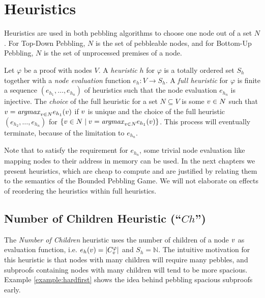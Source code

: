 \section{Heuristics}
\label{sec:heuristics}

Heuristics are used in both pebbling algorithms to choose one node out of a set $N$. 
For Top-Down Pebbling, $N$ is the set of pebbleable nodes, and for Bottom-Up Pebbling, $N$ is the set of unprocessed premises of a node. 

\begin{definition}

Let $\varphi$ be a proof with nodes $V$.
A \emph{heuristic} $h$ for $\varphi$ is a totally ordered set $S_h$ together with a \emph{node evaluation} function $e_h: V \rightarrow S_h$.
A \emph{full heuristic} for $\varphi$ is finite a sequence $(e_{h_1}, \ldots, e_{h_n})$ of heuristics such that the node evaluation $e_{h_n}$ is injective.
The \emph{choice} of the full heuristic for a set $N \subseteq V$ is some $v \in N$ such that $v = \mathit{argmax}_{v \in N} e_{h_1}(v)$ if $v$ is unique and the choice of the full heuristic $(e_{h_2},\ldots,e_{h_n})$ for $\{v \in N \mid v = \mathit{argmax}_{v \in N} e_{h_1}(v)\}$. 
This process will eventually terminate, because of the limitation to $e_{h_n}$.

\end{definition}

Note that to satisfy the requirement for $e_{h_n}$, some trivial node evaluation like mapping nodes to their address in memory can be used.
In the next chapters we present heuristics, which are cheap to compute and are justified by relating them to the semantics of the Bounded Pebbling Game.
We will not elaborate on effects of reordering the heuristics within full heuristics.

\subsection{Number of Children Heuristic (``$Ch$'')}
\label{sec:children}
The \emph{Number of Children} heuristic uses the number of children of a node $v$ as evaluation function, i.e. $e_h(v) = |C_{v}^{\varphi}|$ and $S_h = \mathbb{N}$.
The intuitive motivation for this heuristic is that nodes with many children will require many pebbles, and subproofs containing nodes with many children will tend to be more spacious.
Example \ref{example:hardfirst} shows the idea behind pebbling spacious subproofs early.

